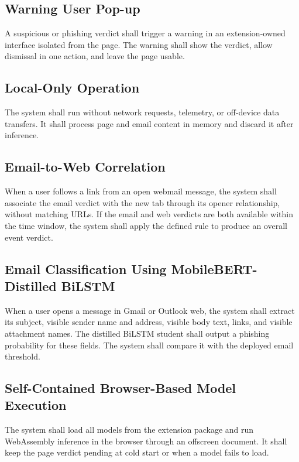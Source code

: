 \documentclass{FastFyp}
\begin{document}
\subsection{Warning User Pop-up}
A suspicious or phishing verdict shall trigger a warning in an extension-owned interface isolated from the page. The warning shall show the verdict, allow dismissal in one action, and leave the page usable.

\subsection{Local-Only Operation}
The system shall run without network requests, telemetry, or off-device data transfers. It shall process page and email content in memory and discard it after inference.

\subsection{Email-to-Web Correlation}
When a user follows a link from an open webmail message, the system shall associate the email verdict with the new tab through its opener relationship, without matching URLs. If the email and web verdicts are both available within the time window, the system shall apply the defined rule to produce an overall event verdict.

\subsection{Email Classification Using MobileBERT-Distilled BiLSTM}
When a user opens a message in Gmail or Outlook web, the system shall extract its subject, visible sender name and address, visible body text, links, and visible attachment names. The distilled BiLSTM student shall output a phishing probability for these fields. The system shall compare it with the deployed email threshold.

\subsection{Self-Contained Browser-Based Model Execution}
The system shall load all models from the extension package and run WebAssembly inference in the browser through an offscreen document. It shall keep the page verdict pending at cold start or when a model fails to load.
\end{document}
